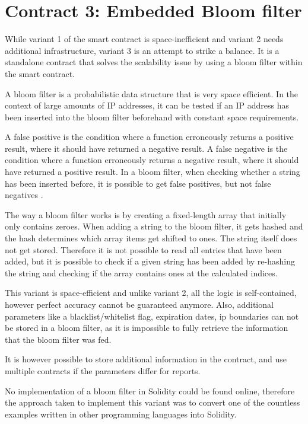 \section{Contract 3: Embedded Bloom filter}

While variant 1 of the smart contract is space-inefficient and variant 2 needs additional infrastructure, variant 3 is an attempt to strike a balance. It is a standalone contract that solves the scalability issue by using a bloom filter within the smart contract.

A bloom filter is a probabilistic data structure that is very space efficient. In the context of large amounts of IP addresses, it can be tested if an IP address has been inserted into the bloom filter beforehand with constant space requirements.

A false positive is the condition where a function erroneously returns a positive result, where it should have returned a negative result. A false negative is the condition where a function erroneously returns a negative result, where it should have returned a positive result. In a bloom filter, when checking whether a string has been inserted before, it is possible to get false positives, but not false negatives \cite{WikipediaBloomfilter}.

The way a bloom filter works is by creating a fixed-length array that initially only contains zeroes. When adding a string to the bloom filter, it gets hashed and the hash determines which array items get shifted to ones. The string itself does not get stored. Therefore it is not possible to read all entries that have been added, but it is possible to check if a given string has been added by re-hashing the string and checking if the array contains ones at the calculated indices.

This variant is space-efficient and unlike variant 2,  all the logic is self-contained, however perfect accuracy cannot be guaranteed anymore. Also, additional parameters like a blacklist/whitelist flag, expiration dates, ip boundaries can not be stored in a bloom filter, as it is impossible to fully retrieve the information that the bloom filter was fed.

It is however possible to store additional information in the contract, and use multiple contracts if the parameters differ for reports.

No implementation of a bloom filter in Solidity could be found online, therefore the approach taken to implement this variant was to convert one of the countless examples written in other programming languages into Solidity.

